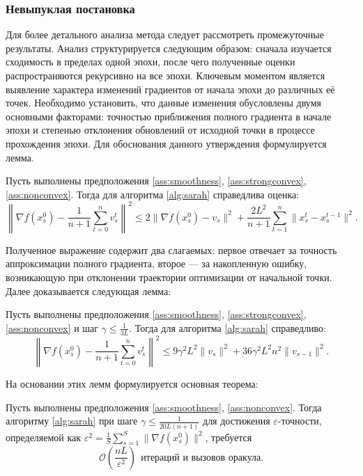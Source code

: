 \subsubsection{Невыпуклая постановка}\label{subsection:sarahnonconvex}
Для более детального анализа метода следует рассмотреть промежуточные результаты. Анализ структурируется следующим образом: сначала изучается сходимость в пределах одной эпохи, после чего полученные оценки распространяются рекурсивно на все эпохи. Ключевым моментом является выявление характера изменений градиентов от начала эпохи до различных её точек. Необходимо установить, что данные изменения обусловлены двумя основными факторами: точностью приближения полного градиента в начале эпохи и степенью отклонения обновлений от исходной точки в процессе прохождения эпохи. Для обоснования данного утверждения формулируется лемма. 
\begin{lemma}\label{l1:sarahmain}
    Пусть выполнены предположения \ref{ass:smoothness}, \ref{ass:strongconvex}, \ref{ass:nonconvex}. Тогда для алгоритма \ref{alg:sarah} справедлива оценка:
    \[
    \left\| \nabla f(x_s^0) - \frac{1}{n+1}\sum\limits_{t=0}^n v_s^t\right\|^2 \leqslant 2\|\nabla f(x_{s}^0) - v_s \|^2 + \frac{2L^2}{n+1}\sum\limits_{t=1}^n \|x_s^t - x_s^{t-1}\|^2.
    \]
\end{lemma}

Полученное выражение содержит два слагаемых: первое отвечает за точность аппроксимации полного градиента, второе — за накопленную ошибку, возникающую при отклонении траектории оптимизации от начальной точки. Далее доказывается следующая лемма:

\begin{lemma}\label{l2:sarahmain}
    Пусть выполнены предположения \ref{ass:smoothness}, \ref{ass:strongconvex}, \ref{ass:nonconvex} и шаг $\gamma \leqslant \frac{1}{3L}$. Тогда для алгоритма \ref{alg:sarah} справедливо:
    \[
    \left\| \nabla f(x_s^0) - \frac{1}{n+1}\sum\limits_{t=0}^n v_s^t\right\|^2 \leqslant 9\gamma^2L^2\|v_{s}\|^2 + 36\gamma^2L^2n^2\|v_{s-1}\|^2.
    \]
\end{lemma}

На основании этих лемм формулируется основная теорема:

\begin{theorem}\label{th1:sarahmain}
   Пусть выполнены предположения \ref{ass:smoothness}, \ref{ass:nonconvex}. Тогда алгоритму \ref{alg:sarah} при шаге $\gamma\leqslant\frac{1}{20L(n+1)}$ для достижения $\varepsilon$-точности, определяемой как $\varepsilon^2 = \frac{1}{S}\sum\limits_{s=1}^{S} \|\nabla f(x_s^0)\|^2$, требуется 
   \[ 
   \mathcal{O} \left(\frac{nL}{\varepsilon^2}\right)~~\text{итераций и вызовов оракула.}
   \]
\end{theorem}

